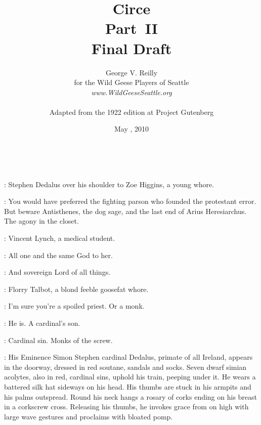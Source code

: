 



\title{Circe\\
Part~II\\
\small Final Draft}
\author{George V. Reilly\\
for the Wild Geese Players of Seattle\\
{\emph{www.WildGeeseSeattle.org}}\\
\\
\small Adapted from the 1922 edition at Project Gutenberg}
\date{May , 2010}
\raggedbottom



\maketitle
\thispagestyle{empty}
\pagebreak

~
\thispagestyle{empty}
\newpage

\setcounter{page}{1}



:
Stephen Dedalus over his shoulder to Zoe Higgins, a young whore.

\Stephen:
You would have preferred the fighting parson who founded the protestant error.
But beware Antisthenes, the dog sage, and the last end of Arius Heresiarchus.
The agony in the closet.

:
Vincent Lynch, a medical student.

\Lynch:
All one and the same God to her.

\Stephen:
And sovereign Lord of all things.

:
Florry Talbot, a blond feeble goosefat whore.

\Florry:
I'm sure you're a spoiled priest.
Or a monk.

\Lynch:
He is.
A cardinal's son.

\Stephen:
Cardinal sin.
Monks of the screw.

:
His Eminence Simon Stephen cardinal Dedalus, primate of all Ireland,
appears in the doorway, dressed in red soutane, sandals and socks.
Seven dwarf simian acolytes, also in red, cardinal sins,
uphold his train, peeping under it.
He wears a battered silk hat sideways on his head.
His thumbs are stuck in his armpits and his palms outspread.
Round his neck hangs a rosary of corks ending on his breast in a corkscrew cross.
Releasing his thumbs, he invokes grace from on high with large wave gestures
and proclaims with bloated pomp.

